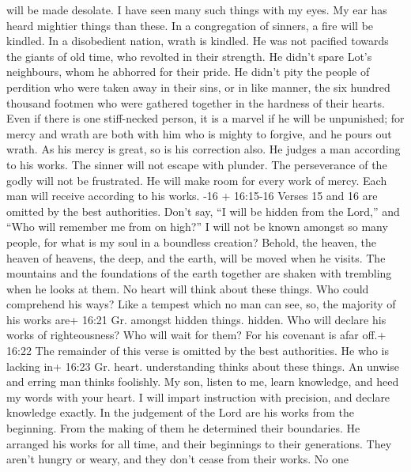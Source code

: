 will be made desolate.  I have seen many such things with my
eyes. My ear has heard mightier things than these.  In a
congregation of sinners, a fire will be kindled. In a disobedient
nation, wrath is kindled.  He was not pacified towards the
giants of old time, who revolted in their strength.  He
didn't spare Lot's neighbours, whom he abhorred for their pride.
 He didn't pity the people of perdition who were taken away
in their sins,  or in like manner, the six hundred thousand
footmen who were gathered together in the hardness of their hearts.
 Even if there is one stiff-necked person, it is a marvel
if he will be unpunished; for mercy and wrath are both with him who is
mighty to forgive, and he pours out wrath.  As his mercy is
great, so is his correction also. He judges a man according to his
works.  The sinner will not escape with plunder. The
perseverance of the godly will not be frustrated.  He will
make room for every work of mercy. Each man will receive according to
his works. -16 + 16:15-16 Verses 15 and 16 are omitted by
the best authorities.  Don't say, ``I will be hidden from
the Lord,'' and ``Who will remember me from on high?'' I will not be
known amongst so many people, for what is my soul in a boundless
creation?  Behold, the heaven, the heaven of heavens, the
deep, and the earth, will be moved when he visits.  The
mountains and the foundations of the earth together are shaken with
trembling when he looks at them.  No heart will think about
these things. Who could comprehend his ways?  Like a
tempest which no man can see, so, the majority of his works are+ 16:21
Gr. amongst hidden things. hidden.  Who will declare his
works of righteousness? Who will wait for them? For his covenant is afar
off.+ 16:22 The remainder of this verse is omitted by the best
authorities.  He who is lacking in+ 16:23 Gr. heart.
understanding thinks about these things. An unwise and erring man thinks
foolishly.  My son, listen to me, learn knowledge, and heed
my words with your heart.  I will impart instruction with
precision, and declare knowledge exactly.  In the judgement
of the Lord are his works from the beginning. From the making of them he
determined their boundaries.  He arranged his works for all
time, and their beginnings to their generations. They aren't hungry or
weary, and they don't cease from their works.  No one
